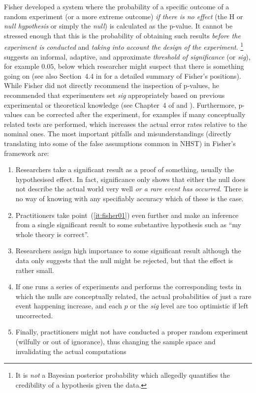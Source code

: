Fisher developed a system where the probability of a specific outcome of a random experiment (or a more extreme outcome) \textit{if there is no effect} (the H or \textit{null hypothesis} or simply the \textit{null}) is calculated as the p-value.
It cannot be stressed enough that this is the probability of obtaining such results \textit{before the experiment is conducted} and \textit{taking into account the design of the experiment}.%
\footnote{It is \textit{not} a Bayesian posterior probability which allegedly quantifies the credibility of a hypothesis given the data.}
\textcite[504]{Fisher1926} suggests an informal, adaptive, and approximate \textit{threshold of significance} (or \textit{sig}), for example $0.05$, below which researcher might suspect that there is something going on (see also Section~4.4 in \citealt{Lehmann2011} for a detailed summary of Fisher's positions).
While Fisher did not directly recommend the inspection of p-values, he recommended that experimenters set \textit{sig} appropriately based on previous experimental or theoretical knowledge (see Chapter~4 of \citealt{Lehmann2011} and \citealt{Perezgonzalez2015}).
Furthermore, p-values can be corrected after the experiment, for examples if many conceptually related tests are performed, which increases the actual error rates relative to the nominal ones.
The most important pitfalls and misunderstandings (directly translating into some of the false assumptions common in NHST) in Fisher's framework are:

\vspace{\baselineskip}
\begin{enumerate}
  \item \label{it:fisher01} Researchers take a significant result as a proof of something, usually the hypothesised effect.
    In fact, significance only shows that either the null does not describe the actual world very well \textit{or a rare event has occurred}.
    There is no way of knowing with any specifiably accuracy which of these is the case.
  \item \label{it:fisher02} Practitioners take point~(\ref{it:fisher01}) even further and make an inference from a single significant result to some substantive hypothesis such as ``my whole theory is correct''.
  \item \label{it:fisher03} Researchers assign high importance to some significant result although the data only suggests that the null might be rejected, but that the effect is rather small.
  \item \label{it:fisher04} If one runs a series of experiments and performs the corresponding tests in which the nulls are conceptually related, the actual probabilities of just a rare event happening increase, and each $p$ or the \textit{sig} level are too optimistic if left uncorrected.
  \item \label{it:fisher05} Finally, practitioners might not have conducted a proper random experiment (wilfully or out of ignorance), thus changing the sample space and invalidating the actual computations
\end{enumerate}
\vspace{\baselineskip}

